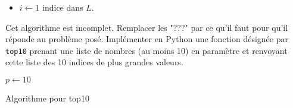 \begin{enumerate}
\begin{itemize}
  \item $i\leftarrow 1$ indice dans $L$.
\end{itemize}
Cet algorithme est incomplet. Remplacer les "???" par ce qu'il faut pour qu'il réponde au problème posé.\newline
Implémenter en Python une fonction désignée par \verb|top10| prenant une liste de nombres (au moins 10) en paramètre et renvoyant cette liste des 10 indices de plus grandes valeurs.
\begin{algorithm}
  $p\leftarrow 10$\;
  \caption{Algorithme pour top10}
  \label{Efreqtexte_1}
\end{algorithm}
\end{enumerate}

